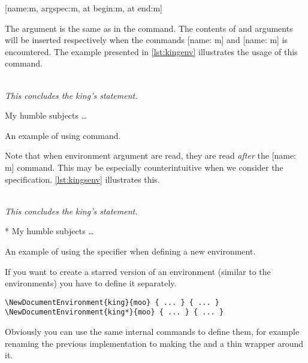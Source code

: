 \begin{lscommand}
  \small
  [name:m, argspec:m, at begin:m, at end:m]
\end{lscommand}
The  argument is the same as in the
 command. The contents of  and  arguments will be inserted respectively when the commands
[name: m] and [name: m] is encountered. The example
presented in \autoref{lst:kingenv} illustrates the usage of this command.
\begin{listing}
  \begin{example}
 {%
  \\[1em]%
  \emph{This concludes
    the king's statement.}%
}

\begin{king}
My humble subjects \ldots
\end{king}
\end{example}
  \caption{An example of using 
    command.}\label{lst:kingenv}
\end{listing}

Note that when environment argument are read, they are read \emph{after} the
[name: m] command. This may be especially counterintuitive when we
consider the  specification. \autoref{lst:kingsenv} illustrates this.
\begin{listing}
  \begin{example}
 {%
  \\[1em]%
  \emph{This concludes
    the king's statement.}%
}

\begin{king}*
My humble subjects \ldots
\end{king}
\end{example}
  \caption{An example of using the  specifier when defining a new
    environment.}\label{lst:kingsenv}
\end{listing}
If you want to create a starred version of an environment (similar to the
 environments) you have to define it separately.
\begin{verbatim}
\NewDocumentEnvironment{king}{moo} { ... } { ... }
\NewDocumentEnvironment{king*}{moo} { ... } { ... }
\end{verbatim}
Obviously you can use the same internal commands to define them, for example
renaming the previous implementation to  making the
 and  a thin wrapper around it.

